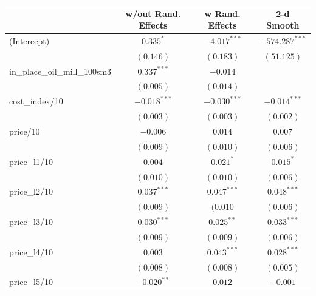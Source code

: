 \documentclass[11pt]{article}
\begin{document}
\begin{table}
\begin{center}
\begin{tabular}{l c c c }
\hline
                                             & w/out Rand. Effects & w Rand. Effects & 2-d Smooth \\
\hline
(Intercept)                                  & $0.335^{*}$    & $-4.017^{***}$ & $-574.287^{***}$ \\
                                             & $(0.146)$      & $(0.183)$      & $(51.125)$       \\
in\_place\_oil\_mill\_100sm3             & $0.337^{***}$  & $-0.014$       &                  \\
                                             & $(0.005)$      & $(0.014)$      &                  \\
cost\_index/10                            & $-0.018^{***}$ & $-0.030^{***}$ & $-0.014^{***}$   \\
                                             & $(0.003)$      & $(0.003)$      & $(0.002)$        \\
price/10                                  & $-0.006$       & $0.014$        & $0.007$          \\
                                             & $(0.009)$      & $(0.010)$      & $(0.006)$        \\
price\_l1/10                              & $0.004$        & $0.021^{*}$    & $0.015^{*}$      \\
                                             & $(0.010)$      & $(0.010)$      & $(0.006)$        \\
price\_l2/10                              & $0.037^{***}$  & $0.047^{***}$  & $0.048^{***}$    \\
                                             & $(0.009)$      & $(0.010$      & $(0.006)$        \\
price\_l3/10                              & $0.030^{***}$  & $0.025^{**}$   & $0.033^{***}$    \\
                                             & $(0.009)$      & $(0.009)$      & $(0.006)$        \\
price\_l4/10                              & $0.003$        & $0.043^{***}$  & $0.028^{***}$    \\
                                             & $(0.008)$      & $(0.008)$      & $(0.005)$        \\
price\_l5/10                              & $-0.020^{**}$  & $0.012$        & $-0.001$         \\

\end{tabular}
\end{center}
\end{table}
\end{document}
